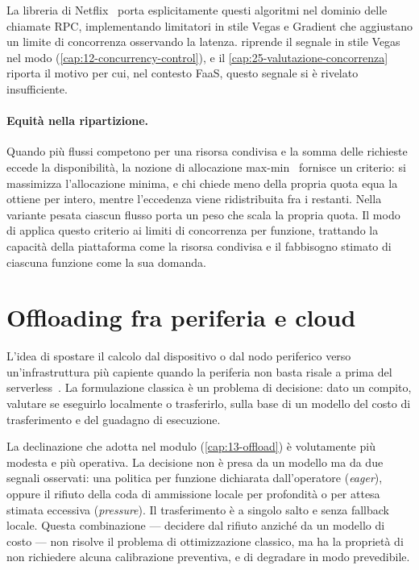 La libreria  di Netflix~\cite{netflixlimits} porta
esplicitamente questi algoritmi nel dominio delle chiamate RPC, implementando
limitatori in stile Vegas e Gradient che aggiustano un limite di concorrenza
osservando la latenza. \nf{} riprende il segnale in stile Vegas nel modo
 (\cref{cap:12-concurrency-control}), e il
\cref{cap:25-valutazione-concorrenza} riporta il motivo per cui, nel contesto
FaaS, questo segnale si \`e rivelato insufficiente.

\paragraph{Equit\`a nella ripartizione.} Quando pi\`u flussi competono per una
risorsa condivisa e la somma delle richieste eccede la disponibilit\`a, la
nozione di allocazione max-min~\cite{bertsekas1992datanetworks} fornisce un
criterio: si massimizza l'allocazione minima, e chi chiede meno della propria
quota equa la ottiene per intero, mentre l'eccedenza viene ridistribuita fra i
restanti. Nella variante pesata ciascun flusso porta un peso che scala la
propria quota. Il modo  di \nf{} applica questo criterio ai limiti
di concorrenza per funzione, trattando la capacit\`a della piattaforma come la
risorsa condivisa e il fabbisogno stimato di ciascuna funzione come la sua
domanda.

\section{Offloading fra periferia e cloud}

L'idea di spostare il calcolo dal dispositivo o dal nodo periferico verso
un'infrastruttura pi\`u capiente quando la periferia non basta risale a prima
del serverless~\cite{bonomi2012fog, shi2016edge, satya2017edge}. La formulazione
classica \`e un problema di decisione: dato un compito, valutare se eseguirlo
localmente o trasferirlo, sulla base di un modello del costo di trasferimento e
del guadagno di esecuzione.

La declinazione che \nf{} adotta nel modulo 
(\cref{cap:13-offload}) \`e volutamente pi\`u modesta e pi\`u operativa. La
decisione non \`e presa da un modello ma da due segnali osservati: una politica
per funzione dichiarata dall'operatore (\emph{eager}), oppure il rifiuto della
coda di ammissione locale per profondit\`a o per attesa stimata eccessiva
(\emph{pressure}). Il trasferimento \`e a singolo salto e senza fallback locale.
Questa combinazione --- decidere dal rifiuto anzich\'e da un modello di costo ---
non risolve il problema di ottimizzazione classico, ma ha la propriet\`a di non
richiedere alcuna calibrazione preventiva, e di degradare in modo prevedibile.

